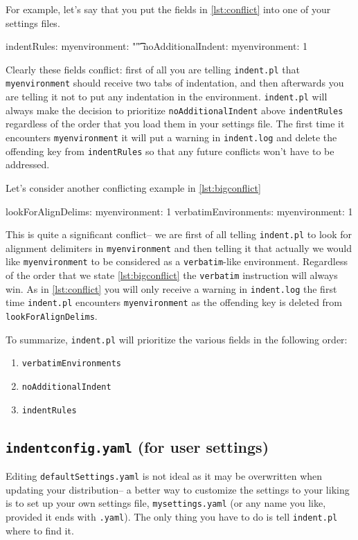  	For example, let's say that you put the fields in \cref{lst:conflict} into 
 	one of your settings files.  
 	\begin{yaml}[caption={Conflicting ideas},label={lst:conflict}]
indentRules:
   myenvironment: "\t\t"
noAdditionalIndent:
   myenvironment: 1
 	\end{yaml}
 	 	
 	Clearly these fields conflict: first of all 
 	you are telling \lstinline!indent.pl! that \lstinline!myenvironment! should 
 	receive two tabs of indentation, and then afterwards you are telling it 
 	not to put any indentation in the environment. \lstinline!indent.pl!
 	will always make the decision to prioritize \lstinline!noAdditionalIndent! above
 	\lstinline!indentRules! regardless of the order that you load them in 
 	your settings file. The first 
 	time it encounters \lstinline!myenvironment! it will put a warning in \lstinline!indent.log!
 	and delete the offending key from \lstinline!indentRules! so that any future 
 	conflicts won't have to be addressed.
 	 	
 	Let's consider another conflicting example in \cref{lst:bigconflict}
 	\begin{yaml}[caption={More conflicting ideas},label={lst:bigconflict}]
lookForAlignDelims:
   myenvironment: 1
verbatimEnvironments:
   myenvironment: 1
 	\end{yaml}
 	This is quite a significant conflict-- we are first of all telling \lstinline!indent.pl!
 	to look for alignment delimiters in \lstinline!myenvironment! and then 
 	telling it that actually we would like \lstinline!myenvironment! to be considered 
 	as a \lstinline!verbatim!-like environment. Regardless of the order that we 
 	state \cref{lst:bigconflict} the \lstinline!verbatim! instruction will always win.
 	As in \cref{lst:conflict} you will only receive a warning in \lstinline!indent.log! the 
 	first time \lstinline!indent.pl! encounters \lstinline!myenvironment! as the 
 	offending key is deleted from \lstinline!lookForAlignDelims!.
 	 	
 	To summarize, \lstinline!indent.pl! will prioritize the various fields in the 
 	following order:
 	\begin{enumerate}
 		\item \lstinline!verbatimEnvironments!
 		\item \lstinline!noAdditionalIndent!
 		\item \lstinline!indentRules!
 	\end{enumerate}
 \subsection{\lstinline!indentconfig.yaml! (for user settings)}\label{sec:indentconfig}
 	Editing \lstinline!defaultSettings.yaml! is not ideal as it may be overwritten when 
 	updating your distribution-- a better way to customize the settings to your liking 
 	is to set up your own settings file, 
 	\lstinline!mysettings.yaml! (or any name you like, provided it ends with \lstinline!.yaml!). 
 	The only thing you have to do is tell \lstinline!indent.pl! where to find it. 
 	 	
